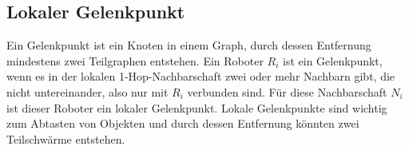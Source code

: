 \subsection{Lokaler Gelenkpunkt}

Ein Gelenkpunkt ist ein Knoten in einem Graph, durch dessen Entfernung mindestens zwei Teilgraphen 
entstehen. Ein Roboter $R_i$ ist ein Gelenkpunkt, wenn es in der lokalen 1-Hop-Nachbarschaft zwei oder 
mehr Nachbarn gibt, die nicht untereinander, also nur mit $R_i$ verbunden sind. Für diese Nachbarschaft
$N_i$ ist dieser Roboter ein lokaler Gelenkpunkt. Lokale Gelenkpunkte sind wichtig zum Abtasten von
Objekten und durch dessen Entfernung könnten zwei Teilschwärme entstehen.